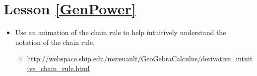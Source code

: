 \section*{Lesson \ref{GenPower}}
\begin{itemize}[leftmargin=*]
    \item Use an animation of the chain rule to help intuitively understand the notation of the chain rule. 
    \begin{itemize}
        \item \url{http://webspace.ship.edu/msrenault/GeoGebraCalculus/derivative_intuitive_chain_rule.html}
    \end{itemize}
     
\end{itemize}